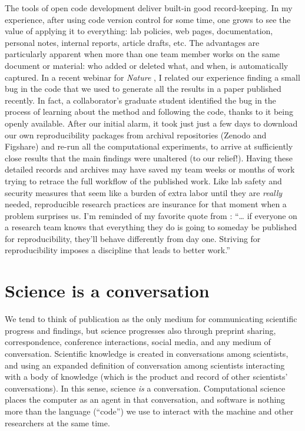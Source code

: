 \documentclass{statement}
\newlength{\up}
\begin{document}
The tools of open code development deliver built-in good record-keeping. 
In my experience, after using code version control for some time, one grows to see the value of applying it to everything: 
lab policies, web pages, documentation, personal notes, internal reports, article drafts, etc. 
The advantages are particularly apparent when more than one team member works on the same document or material: 
who added or deleted what, and when, is automatically captured. 
In a recent webinar for \emph{Nature} \citep{perkel2001}, I related our experience finding a small bug in the code that we used to generate all the results in a paper published recently. 
In fact, a collaborator's graduate student identified the bug in the process of learning about the method and following the code, thanks to it being openly available. 
After our initial alarm, it took just just a few days to download our own reproducibility packages from archival repositories (Zenodo and Figshare) and re-run all the computational experiments, to arrive at sufficiently close results that the main findings were unaltered (to our relief!). 
Having these detailed records and archives may have saved my team weeks or months of work trying to retrace the full workflow of the published work. 
Like lab safety and security measures that seem like a burden of extra labor until they are \emph{really} needed, reproducible research practices are insurance for that moment when a problem surprises us. 
I'm reminded of my favorite quote from \cite{donoho2009}: 
``… if everyone on a research team knows that everything they do is going to someday be published for reproducibility, they’ll behave differently from day one. Striving for reproducibility imposes a discipline that leads to better work.'' 

\section*{Science is a conversation}
\vspace{\up}

We tend to think of publication as the only medium for communicating scientific progress and findings, but science progresses also through preprint sharing, correspondence, conference interactions, social media, and any medium of conversation. 
Scientific knowledge is created in conversations among scientists, and using an expanded definition of conversation among scientists interacting with a body of knowledge (which is the product and record of other scientists' conversations). 
In this sense, science \emph{is} a conversation. 
Computational science places the computer as an agent in that conversation, and software is nothing more than the language (``code'') we use to interact with the machine and other researchers at the same time. 
\end{document}
